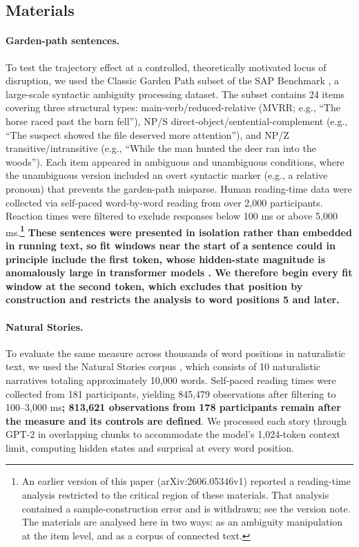 \documentclass[12pt]{article}
\newcommand{\new}[1]{{\bfseries #1}}
\begin{document}
\subsection{Materials}

\paragraph{Garden-path sentences.} To test the trajectory effect at a controlled, theoretically motivated locus of disruption, we used the Classic Garden Path subset of the SAP Benchmark \citep{huang2024}, a large-scale syntactic ambiguity processing dataset. The subset contains 24 items covering three structural types: main-verb/reduced-relative (MVRR; e.g., ``The horse raced past the barn fell''), NP/S direct-object/sentential-complement (e.g., ``The suspect showed the file deserved more attention''), and NP/Z transitive/intransitive (e.g., ``While the man hunted the deer ran into the woods''). Each item appeared in ambiguous and unambiguous conditions, where the unambiguous version included an overt syntactic marker (e.g., a relative pronoun) that prevents the garden-path misparse. Human reading-time data were collected via self-paced word-by-word reading from over 2,000 participants. Reaction times were filtered to exclude responses below 100 ms or above 5,000 ms.\new{\footnote{An earlier version of this paper (arXiv:2606.05346v1) reported a reading-time analysis restricted to the critical region of these materials. That analysis contained a sample-construction error and is withdrawn; see the version note. The materials are analysed here in two ways: as an ambiguity manipulation at the item level, and as a corpus of connected text.}} \new{These sentences were presented in isolation rather than embedded in running text, so fit windows near the start of a sentence could in principle include the first token, whose hidden-state magnitude is anomalously large in transformer models \citep{xiao2023}. We therefore begin every fit window at the second token, which excludes that position by construction and restricts the analysis to word positions 5 and later.}

\paragraph{Natural Stories.} To evaluate the same measure across thousands of word positions in naturalistic text, we used the Natural Stories corpus \citep{futrell2018}, which consists of 10 naturalistic narratives totaling approximately 10,000 words. Self-paced reading times were collected from 181 participants, yielding 845,479 observations after filtering to 100--3,000 ms\new{; 813,621 observations from 178 participants remain after the measure and its controls are defined}. We processed each story through GPT-2 in overlapping chunks to accommodate the model's 1,024-token context limit, computing hidden states and surprisal at every word position.
\end{document}
